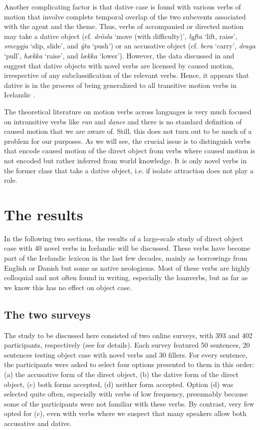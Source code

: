 \documentclass[output=paper,modfonts,nonflat,colorlinks,citecolor=brown]{langsci/langscibook}
\begin{document}
{Another complicating factor is that dative case is found with various verbs of motion that involve complete temporal overlap of the two subevents associated with the agent and the theme. Thus, verbs of accompanied or directed motion may take a dative object (cf. \textit{drösla} ‘move (with difficulty)’, \textit{lyfta} ‘lift, raise’, \textit{smeygja} ‘slip, slide’, and \textit{ýta} ‘push’) or an accusative object (cf. \textit{bera} ‘carry’, \textit{draga} ‘pull’, \textit{hækka} ‘raise’, and \textit{lækka} ‘lower’). However, the data discussed in  and  suggest that dative objects with novel verbs are licensed by caused motion, irrespective of any subclassification of the relevant verbs. Hence, it appears that dative is in the process of being generalized to all transitive motion verbs in Icelandic \citep{Barðdal2008}.

The theoretical literature on motion verbs across languages is very much focused on intransitive verbs like \textit{run} and \textit{dance} and there is no standard definition of caused motion that we are aware of. Still, this does not turn out to be much of a problem for our purposes. As we will see, the crucial issue is to distinguish verbs that encode caused motion of the direct object from verbs where caused motion is not encoded but rather inferred from world knowledge. It is only novel verbs in the former class that take a dative object, i.e. if isolate attraction does not play a role.

\section{The results} %

In the following two sections, the results of a large-scale study of direct object case with 40 novel verbs in Icelandic will be discussed. These verbs have become part of the Icelandic lexicon in the last few decades, mainly as borrowings from English or Danish but some as native neologisms. Most of these verbs are highly colloquial and not often found in writing, especially the loanverbs, but as far as we know this has no effect on object case. 

\subsection{The two surveys} %

The study to be discussed here consisted of two online surveys, with 393 and 402 participants, respectively (see \citealt{Thórarinsdóttir2015} for details). Each survey featured 50 sentences, 20 sentences testing object case with novel verbs and 30 fillers. For every sentence, the participants were asked to select four options presented to them in this order: (a) the accusative form of the direct object, (b) the dative form of the direct object, (c) both forms accepted, (d) neither form accepted. Option (d) was selected quite often, especially with verbs of low frequency, presumably because some of the participants were not familiar with these verbs. By contrast, very few opted for (c), even with verbs where we suspect that many speakers allow both accusative and dative.

}
\end{document}
